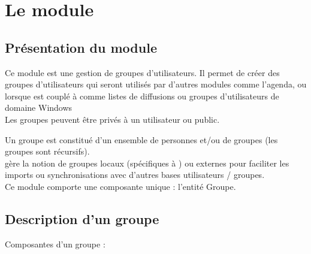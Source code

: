 
\clearpage
\section{Le module \group}

\subsection{Présentation du module \group}

Ce module est une gestion de groupes d'utilisateurs.
Il permet de créer des groupes d'utilisateurs qui seront utilisés par d'autres modules comme l'agenda, ou lorsque \obm est couplé à \aliamin comme listes de diffusions ou groupes d'utilisateurs de domaine Windows\\

Les groupes peuvent être privés à un utilisateur ou public.

Un groupe est constitué d'un ensemble de personnes et/ou de groupes (les groupes sont récursifs).\\

\obm gère la notion de groupes locaux (spécifiques à \obm) ou externes pour faciliter les imports ou synchronisations avec d'autres bases utilisateurs / groupes.\\

Ce module comporte une composante unique : l'entité Groupe.


\subsection{Description d'un groupe}

Composantes d'un groupe :\\

